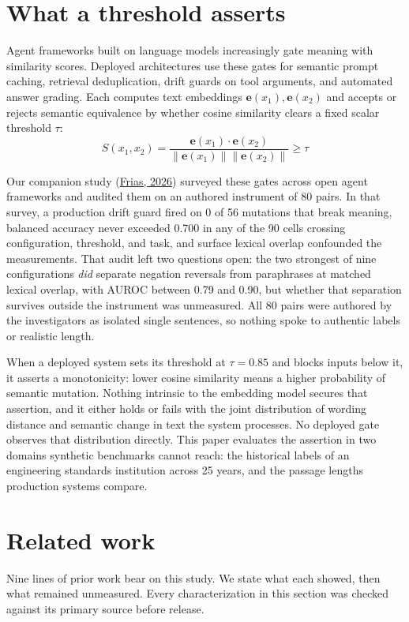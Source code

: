 \documentclass[11pt]{article}
\begin{document}
\section{What a threshold asserts}

Agent frameworks built on language models increasingly gate meaning with similarity scores. Deployed architectures use these gates for semantic prompt caching, retrieval deduplication, drift guards on tool arguments, and automated answer grading. Each computes text embeddings $\mathbf{e}(x_1), \mathbf{e}(x_2)$ and accepts or rejects semantic equivalence by whether cosine similarity clears a fixed scalar threshold $\tau$:
\[
S(x_1, x_2) = \frac{\mathbf{e}(x_1) \cdot \mathbf{e}(x_2)}{\|\mathbf{e}(x_1)\| \|\mathbf{e}(x_2)\|} \ge \tau
\]

Our companion study (\hyperlink{bib:frias}{Frias, 2026}) surveyed these gates across open agent frameworks and audited them on an authored instrument of 80 pairs. In that survey, a production drift guard fired on 0 of 56 mutations that break meaning, balanced accuracy never exceeded 0.700 in any of the 90 cells crossing configuration, threshold, and task, and surface lexical overlap confounded the measurements. That audit left two questions open: the two strongest of nine configurations \emph{did} separate negation reversals from paraphrases at matched lexical overlap, with AUROC between 0.79 and 0.90, but whether that separation survives outside the instrument was unmeasured. All 80 pairs were authored by the investigators as isolated single sentences, so nothing spoke to authentic labels or realistic length.

When a deployed system sets its threshold at $\tau = 0.85$ and blocks inputs below it, it asserts a monotonicity: lower cosine similarity means a higher probability of semantic mutation. Nothing intrinsic to the embedding model secures that assertion, and it either holds or fails with the joint distribution of wording distance and semantic change in text the system processes. No deployed gate observes that distribution directly. This paper evaluates the assertion in two domains synthetic benchmarks cannot reach: the historical labels of an engineering standards institution across 25 years, and the passage lengths production systems compare.

\section{Related work}

Nine lines of prior work bear on this study. We state what each showed, then what remained unmeasured. Every characterization in this section was checked against its primary source before release.
\end{document}
